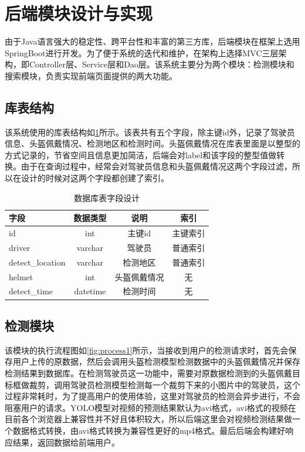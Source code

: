 \section{后端模块设计与实现}
由于Java语言强大的稳定性、跨平台性和丰富的第三方库，后端模块在框架上选用SpringBoot进行开发。为了便于系统的迭代和维护，在架构上选择MVC三层架构，即Controller层、Service层和Dao层。该系统主要分为两个模块：检测模块和搜索模块，负责实现前端页面提供的两大功能。

\subsection{库表结构}
该系统使用的库表结构如\ref{tab:datatable}所示。该表共有五个字段，除主键id外，记录了驾驶员信息、头盔佩戴情况、检测地区和检测时间。头盔佩戴情况在库表里面是以整型的方式记录的，节省空间且信息更加简洁，后端会对label和该字段的整型值做转换。由于在查询过程中，经常会对驾驶员信息和头盔佩戴情况这两个字段过滤，所以在设计的时候对这两个字段都创建了索引。

\begin{table}[htbp]
    \centering
    \caption{数据库表字段设计} %
    \label{tab:datatable}
    \begin{tabular}{lccc} %
        \toprule %
        字段 & 数据类型 & 说明 & 索引 \\
        \midrule %
        id & int & 主键id & 主键索引 \\
        driver & varchar & 驾驶员 & 普通索引\\
        detect\_location & varchar & 检测地区 & 普通索引 \\
        helmet & int & 头盔佩戴情况 & 无 \\
        detect\_time & datetime & 检测时间 & 无 \\
        \bottomrule %
    \end{tabular}
\end{table}

\subsection{检测模块}
该模块的执行流程图如\ref{fig:process1}所示，当接收到用户的检测请求时，首先会保存用户上传的原数据，然后会调用头盔检测模型检测数据中的头盔佩戴情况并保存检测结果到数据库。在检测驾驶员这一功能中，需要对原数据检测到的头盔佩戴目标框做裁剪，调用驾驶员检测模型检测每一个裁剪下来的小图片中的驾驶员，这个过程非常耗时，为了提高用户的使用体验，这里对驾驶员的检测会异步进行，不会阻塞用户的请求。YOLO模型对视频的预测结果默认为avi格式，avi格式的视频在目前各个浏览器上兼容性并不好且体积较大，所以后端这里会对视频检测结果做一个数据格式转换，由avi格式转换为兼容性更好的mp4格式。最后后端会构建好响应结果，返回数据给前端用户。

